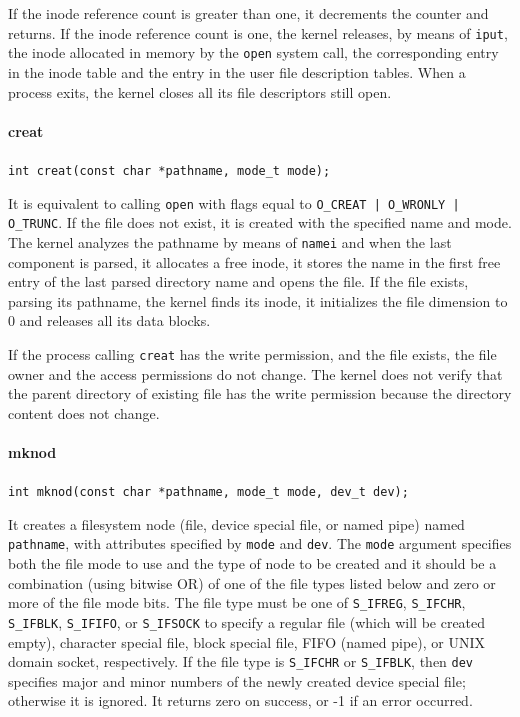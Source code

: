 If the inode reference count is greater than one, it decrements the counter and returns. If the inode reference count is one, the kernel releases, by means of \texttt{iput}, the inode allocated in memory by the \texttt{open} system call, the corresponding entry in the inode table and the entry in the user file description tables. When a process exits, the kernel closes all its file descriptors still open. 

\paragraph{creat}
\texttt{int creat(const char *pathname, mode\_t mode);}

It is equivalent to calling \texttt{open} with flags equal to \texttt{O\_CREAT | O\_WRONLY | O\_TRUNC}. If the file does not exist, it is created with the specified name and mode. The kernel analyzes the pathname by means of \texttt{namei} and when the last component is parsed, it allocates a free inode, it stores the name in the first free entry of the last parsed directory name and opens the file. If the file exists, parsing its pathname, the kernel finds its inode, it initializes the file dimension to 0 and releases all its data blocks.

If the process calling \texttt{creat} has the write permission, and the file exists, the file owner and the access permissions do not change. The kernel does not verify that the parent directory of existing file has the write permission because the directory content does not change.

\paragraph{mknod}
\texttt{int mknod(const char *pathname, mode\_t mode, dev\_t dev);}

It creates a filesystem node (file, device special file, or named pipe) named \texttt{pathname}, with attributes specified by \texttt{mode} and \texttt{dev}. The \texttt{mode} argument specifies both the file mode to use and the type of node to be created and it should be a combination (using bitwise OR) of one of the file types listed below and zero or more of the file mode bits. The file type must be one of \texttt{S\_IFREG}, \texttt{S\_IFCHR}, \texttt{S\_IFBLK}, \texttt{S\_IFIFO}, or \texttt{S\_IFSOCK} to specify a regular file (which will be created empty), character special file, block special file, FIFO (named pipe), or UNIX domain socket, respectively. If the file type is \texttt{S\_IFCHR} or \texttt{S\_IFBLK}, then \texttt{dev} specifies major and minor numbers of the newly created device special file; otherwise it is ignored. It returns zero on success, or -1 if an error occurred.

